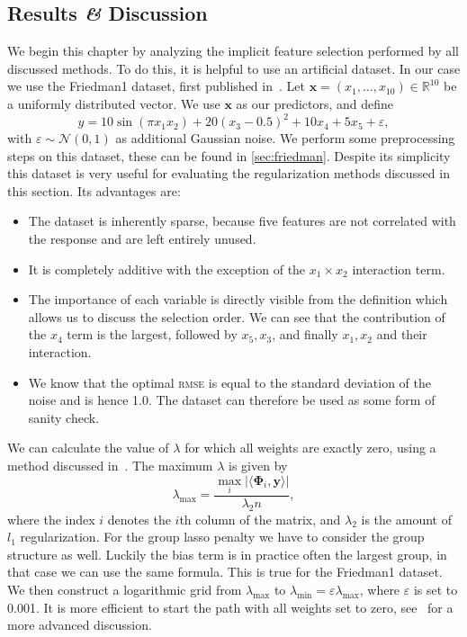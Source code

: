 \subsection{Results \textit{\&} Discussion}
We begin this chapter by analyzing the implicit feature selection performed by
all discussed methods.
To do this, it is helpful to use an artificial dataset.
In our case we use the Friedman1 dataset, first published in~\cite{datasets-friedman}.
Let \(\bm{x} = (x_1, \ldots, x_{10}) \in \mathbb{R}^{10}\) be a uniformly distributed vector.
We use \(\bm{x}\) as our predictors, and define
\begin{equation}\label{eq:friedman1}
  y = 10 \sin(\pi x_1 x_2) + 20(x_3 - 0.5)^2 + 10x_4 + 5x_5 + \varepsilon,
\end{equation}
with \(\varepsilon \sim \mathcal{N}(0,1)\) as additional Gaussian noise.
We perform some preprocessing steps on this dataset, these can be found in \cref{sec:friedman}.
Despite its simplicity this dataset is very useful for evaluating the
regularization methods discussed in this section.
Its advantages are:
\begin{itemize}
\item The dataset is inherently sparse, because five features are not correlated with the
  response and are left entirely unused.
\item It is completely additive with the exception of the \(x_1 \times x_2\)
  interaction term.
\item The importance of each variable is directly visible from the definition
  which allows us to discuss the selection order.
  We can see that the contribution of the \(x_4\) term is the largest, followed
  by \(x_5, x_3\), and finally \(x_1, x_2\) and their interaction.
\item We know that the optimal \textsc{rmse} is equal to the standard deviation
  of the noise and is hence 1.0.
  The dataset can therefore be used as some form of sanity check.
\end{itemize}

We can calculate the value of \(\lambda\) for which all weights are exactly zero, using a method discussed in~\cite{regularizationpaths}.
The maximum \(\lambda\) is given by
\begin{equation*}
  \lambda_{\text{max}} = \frac{\max_i \vert \langle \bm{\Phi}_i, \bm{y} \rangle \vert}{\lambda_2 n},
\end{equation*}
where the index \(i\) denotes the \(i\)th column of the matrix, and
\(\lambda_2\) is the amount of \(l_1\) regularization.
For the group lasso penalty we have to consider the group structure as well.
Luckily the bias term is in practice often the largest group, in that case we can use the same formula.
This is true for the Friedman1 dataset.
We then construct a logarithmic grid from \(\lambda_{\text{max}}\) to \(\lambda_{\text{min}} = \varepsilon \lambda_{\text{max}}\), where \(\varepsilon\) is set to 0.001.
It is more efficient to start the path with all weights set to zero,
see~\cite{regularizationpaths} for a more advanced discussion.

